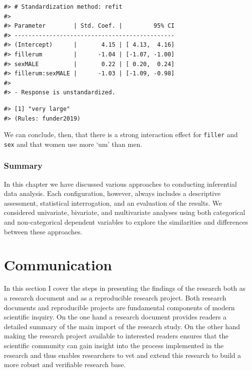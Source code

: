 \documentclass[
  letterpaper,
]{latex/krantz}
\newenvironment{Shaded}{\begin{snugshade}}{\end{snugshade}}
\newcommand{\CommentTok}[1]{\textcolor[rgb]{0.00,0.00,0.00}{\textit{#1}}}
\newcommand{\DecValTok}[1]{\textcolor[rgb]{0.00,0.00,0.00}{#1}}
\newcommand{\FunctionTok}[1]{\textcolor[rgb]{0.00,0.00,0.00}{#1}}
\newcommand{\NormalTok}[1]{\textcolor[rgb]{0.00,0.00,0.00}{#1}}
\newcommand{\SpecialCharTok}[1]{\textcolor[rgb]{0.00,0.00,0.00}{#1}}
\begin{document}
\begin{verbatim}
#> # Standardization method: refit
#> 
#> Parameter        | Std. Coef. |         95% CI
#> ----------------------------------------------
#> (Intercept)      |       4.15 | [ 4.13,  4.16]
#> fillerum         |      -1.04 | [-1.07, -1.00]
#> sexMALE          |       0.22 | [ 0.20,  0.24]
#> fillerum:sexMALE |      -1.03 | [-1.09, -0.98]
#> 
#> - Response is unstandardized.
\end{verbatim}

\begin{Shaded}
\end{Shaded}

\begin{verbatim}
#> [1] "very large"
#> (Rules: funder2019)
\end{verbatim}

We can conclude, then, that there is a strong interaction effect for
\texttt{filler} and \texttt{sex} and that women use more `um' than men.

\hypertarget{summary-13}{%
\section{Summary}\label{summary-13}}

In this chapter we have discussed various approaches to conducting
inferential data analysis. Each configuration, however, always includes
a descriptive assessment, statistical interrogation, and an evaluation
of the results. We considered univariate, bivariate, and multivariate
analyses using both categorical and non-categorical dependent variables
to explore the similarities and differences between these approaches.

\part{Communication}

In this section I cover the steps in presenting the findings of the
research both as a research document and as a reproducible research
project. Both research documents and reproducible projects are
fundamental components of modern scientific inquiry. On the one hand a
research document provides readers a detailed summary of the main import
of the research study. On the other hand making the research project
available to interested readers ensures that the scientific community
can gain insight into the process implemented in the research and thus
enables researchers to vet and extend this research to build a more
robust and verifiable research base.
\end{document}
